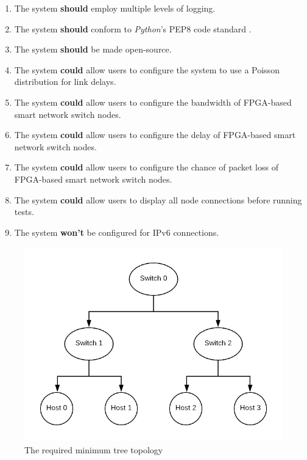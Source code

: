 \begin{enumerate}[label=\textbf{F\arabic*:}]
  \item The system \textbf{should} employ multiple levels of logging.
  \item The system \textbf{should} conform to \textit{Python}'s PEP8 code standard \cite{python_pep8}.
  \item The system \textbf{should} be made open-source.
  \item The system \textbf{could} allow users to configure the system to use a Poisson distribution for link delays.
  \item The system \textbf{could} allow users to configure the bandwidth of FPGA-based smart network switch nodes.
  \item The system \textbf{could} allow users to configure the delay of FPGA-based smart network switch nodes.
  \item The system \textbf{could} allow users to configure the chance of packet loss of FPGA-based smart network switch nodes.
  \item The system \textbf{could} allow users to display all node connections before running tests.
  \item The system \textbf{won't} be configured for IPv6 connections.
\end{enumerate}


\begin{figure}[t]
  \centering
  \includegraphics[width=\textwidth]{assets/minimum_tree.png}
  \caption{The required minimum tree topology}
  \label{minimum_tree}
\end{figure}

